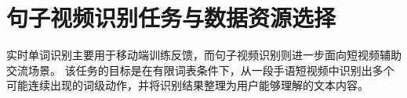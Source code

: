\section{句子视频识别任务与数据资源选择}

实时单词识别主要用于移动端训练反馈，而句子视频识别则进一步面向短视频辅助交流场景。
该任务的目标是在有限词表条件下，从一段手语短视频中识别出多个可能连续出现的词级动作，并将识别结果整理为用户能够理解的文本内容。




